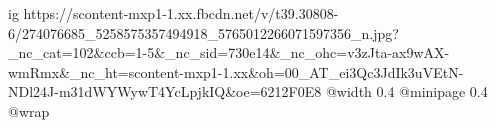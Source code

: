  
 
 
 
 

\ifcmt
  ig https://scontent-mxp1-1.xx.fbcdn.net/v/t39.30808-6/274076685_5258575357494918_5765012266071597356_n.jpg?_nc_cat=102&ccb=1-5&_nc_sid=730e14&_nc_ohc=v3zJta-ax9wAX-wmRmx&_nc_ht=scontent-mxp1-1.xx&oh=00_AT_ei3Qc3JdIk3uVEtN-NDl24J-m31dWYWywT4YcLpjkIQ&oe=6212F0E8
  @width 0.4
  @minipage 0.4
  @wrap \parpic[r]
\fi
